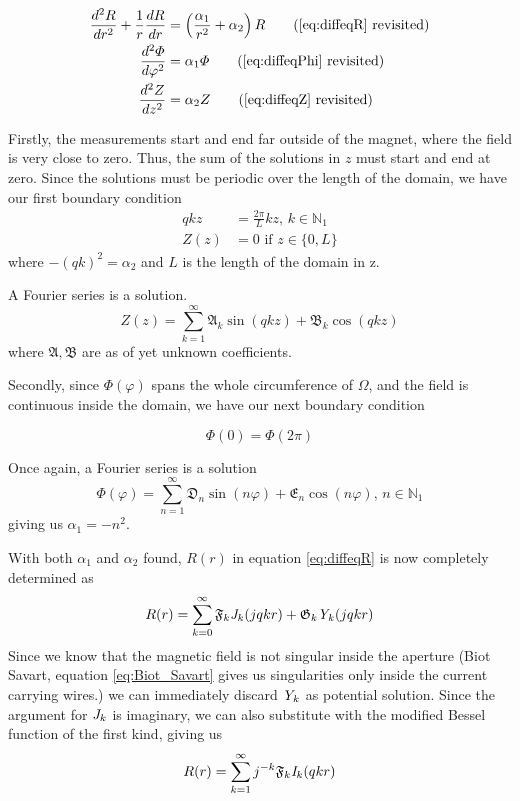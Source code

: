 \begin{align*}
    \frac{d^2R}{dr^2} + \frac{1}{r} \frac{dR}{dr} & =
    \left( \frac{\alpha_1}{r^2} + \alpha_2 \right)R
    \tag{\ref{eq:diffeqR} revisited}                                  \\
    \frac{d^2 \varPhi}{d\varphi^2}                & = \alpha_1\varPhi
    \tag{\ref{eq:diffeqPhi} revisited}                                \\
    \frac{d^2 Z}{dz^2}                            & = \alpha_2 Z
    \tag{\ref{eq:diffeqZ} revisited}
\end{align*}

Firstly, the measurements start and end far outside of the magnet,
where the field is very close to zero. Thus, the sum of the solutions
in $z$ must start and end at zero. Since the solutions must be periodic
over the length of the domain, we have our first boundary condition
\begin{align}
    qkz  & = \frac{2\pi}{L}kz, \,k\in\mathbb{N}_1 \\
    Z(z) & = 0\text{ if } z\in\{0,L\}
\end{align}
where $-(qk)^2 = \alpha_2$ and $L$ is the length of the domain in z.

A Fourier series is a solution.
\begin{equation}
    Z(z) = \sum\limits_{k=1}^{\infty}
    \mathfrak{A}_k\sin{(qkz)} + \mathfrak{B}_k\cos{(qkz)}
\end{equation}
where $\mathfrak{A, B}$ are as of yet unknown coefficients.

Secondly, since $\varPhi(\varphi)$ spans the whole circumference of
$\Omega$, and the field is continuous inside the domain, we have
our next boundary condition

\begin{equation}
    \varPhi(0) = \varPhi(2\pi)
\end{equation}

Once again, a Fourier series is a solution
\begin{equation}
    \varPhi(\varphi) = \sum\limits_{n=1}^{\infty}
    \mathfrak{D}_n\sin{(n\varphi)} + \mathfrak{E}_n\cos{(n\varphi)}
    , \, n\in\mathbb{N}_1
\end{equation}
giving us $\alpha_1 = -n^2$.

With both $\alpha_1$ and $\alpha_2$ found, $R(r)$ in equation \ref{eq:diffeqR}
is now completely determined as
\begin{equation}
    R(r) = \sum\limits_{k=0}^{\infty}
    \mathfrak{F}_{k}\mathit{J}_{k}(jqkr) + \mathfrak{G}_k\mathit{Y}_{k}(jqkr)
\end{equation}
Since we know that the magnetic field is not singular inside the aperture
(Biot Savart, equation \ref{eq:Biot_Savart} gives us singularities only inside
the current carrying wires.) we can immediately discard $\mathit{Y}_{k}$ as potential
solution. Since the argument for $\mathit{J}_{k}$ is imaginary, we can also substitute
with the modified Bessel function of the first kind, giving us
\begin{equation}
    R(r) = \sum\limits_{k=1}^{\infty}
    j^{-k}\mathfrak{F}_{k}\mathit{I}_{k}(qkr)
\end{equation}

